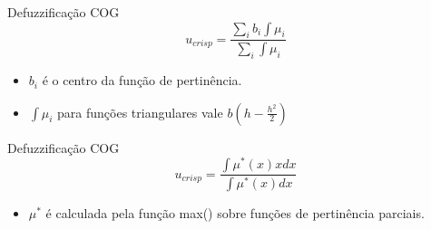 \begin{frame}
	
\end{frame}

\begin{frame}
	
\end{frame}

\begin{frame}
	
\end{frame}

\begin{frame}
	
\end{frame}

\begin{frame}
	\begin{block}{Defuzzificação COG}
		\begin{equation}
			u_{crisp} = \frac{\sum_i b_i \int \mu_i}{\sum_i \int \mu_i}
		\end{equation}
		\begin{itemize}
		  \item $b_i$ é o centro da função de pertinência.
		  \item $\int \mu_i$ para funções triangulares vale $b(h-\frac{h^2}{2})$
		\end{itemize}
	\end{block}
\end{frame}

\begin{frame}
	\begin{block}{Defuzzificação COG}
		\begin{equation}
			u_{crisp} = \frac{\int \mu^* (x) x dx}{\int \mu^* (x) dx}
		\end{equation}
		\begin{itemize}
		  \item $\mu^*$ é calculada pela função max() sobre funções de pertinência
		  parciais.
		\end{itemize}
	\end{block}
\end{frame}
	
